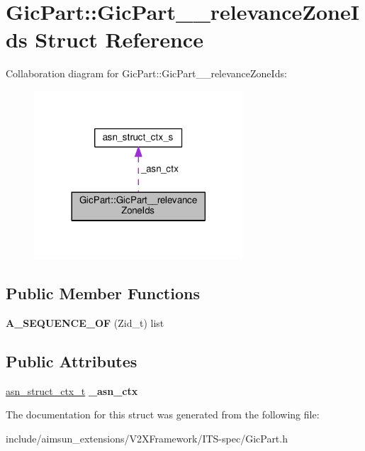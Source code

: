 \hypertarget{structGicPart_1_1GicPart____relevanceZoneIds}{}\section{Gic\+Part\+:\+:Gic\+Part\+\_\+\+\_\+relevance\+Zone\+Ids Struct Reference}
\label{structGicPart_1_1GicPart____relevanceZoneIds}


Collaboration diagram for Gic\+Part\+:\+:Gic\+Part\+\_\+\+\_\+relevance\+Zone\+Ids\+:\nopagebreak
\begin{figure}[H]
\begin{center}
\leavevmode
\includegraphics[width=221pt]{structGicPart_1_1GicPart____relevanceZoneIds__coll__graph}
\end{center}
\end{figure}
\subsection*{Public Member Functions}
\begin{DoxyCompactItemize}
\item 
{\bfseries A\+\_\+\+S\+E\+Q\+U\+E\+N\+C\+E\+\_\+\+OF} (Zid\+\_\+t) list\hypertarget{structGicPart_1_1GicPart____relevanceZoneIds_a4350b0f0e8df658f3a1bcadcb39aca58}{}\label{structGicPart_1_1GicPart____relevanceZoneIds_a4350b0f0e8df658f3a1bcadcb39aca58}

\end{DoxyCompactItemize}
\subsection*{Public Attributes}
\begin{DoxyCompactItemize}
\item 
\hyperlink{structasn__struct__ctx__s}{asn\+\_\+struct\+\_\+ctx\+\_\+t} {\bfseries \+\_\+asn\+\_\+ctx}\hypertarget{structGicPart_1_1GicPart____relevanceZoneIds_af8ea8d3be607b47a13add935e43785d6}{}\label{structGicPart_1_1GicPart____relevanceZoneIds_af8ea8d3be607b47a13add935e43785d6}

\end{DoxyCompactItemize}


The documentation for this struct was generated from the following file\+:\begin{DoxyCompactItemize}
\item 
include/aimsun\+\_\+extensions/\+V2\+X\+Framework/\+I\+T\+S-\/spec/Gic\+Part.\+h\end{DoxyCompactItemize}
